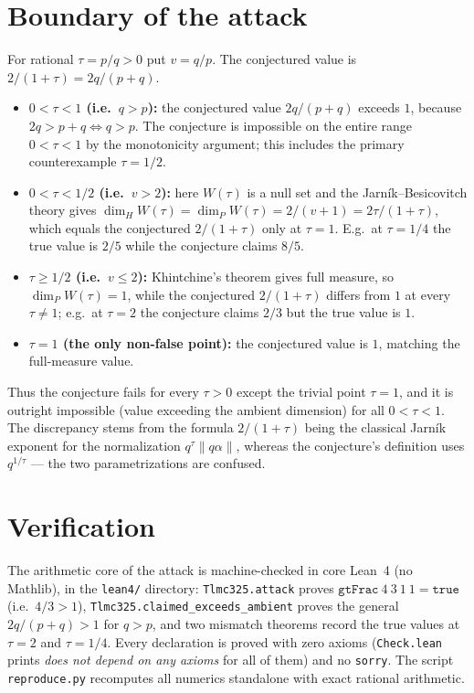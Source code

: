 \documentclass[11pt]{article}
\theoremstyle{definition}
\begin{document}
\section{Boundary of the attack}

For rational $\tau = p/q > 0$ put $v = q/p$. The conjectured value is
$2/(1+\tau) = 2q/(p+q)$.

\begin{itemize}
\item \textbf{$0 < \tau < 1$ (i.e.\ $q > p$):} the conjectured value
$2q/(p+q)$ exceeds $1$, because $2q > p+q \iff q > p$. The conjecture is
impossible on the entire range $0 < \tau < 1$ by the monotonicity argument;
this includes the primary counterexample $\tau = 1/2$.
\item \textbf{$0 < \tau < 1/2$ (i.e.\ $v > 2$):} here $W(\tau)$ is a null
set and the Jarn\'ik--Besicovitch theory gives
$\dim_H W(\tau) = \dim_P W(\tau) = 2/(v+1) = 2\tau/(1+\tau)$,
which equals the conjectured $2/(1+\tau)$ only at $\tau = 1$. E.g.\ at
$\tau = 1/4$ the true value is $2/5$ while the conjecture claims $8/5$.
\item \textbf{$\tau \ge 1/2$ (i.e.\ $v \le 2$):} Khintchine's theorem gives
full measure, so $\dim_P W(\tau) = 1$, while the conjectured $2/(1+\tau)$
differs from $1$ at every $\tau \neq 1$; e.g.\ at $\tau = 2$ the conjecture
claims $2/3$ but the true value is $1$.
\item \textbf{$\tau = 1$ (the only non-false point):} the conjectured value
is $1$, matching the full-measure value.
\end{itemize}

Thus the conjecture fails for every $\tau > 0$ except the trivial point
$\tau = 1$, and it is outright impossible (value exceeding the ambient
dimension) for all $0 < \tau < 1$. The discrepancy stems from the formula
$2/(1+\tau)$ being the classical Jarn\'ik exponent for the
normalization $q^{\tau}\|q\alpha\|$, whereas the conjecture's
definition uses $q^{1/\tau}$ — the two parametrizations are confused.

\section{Verification}

The arithmetic core of the attack is machine-checked in core Lean~4
(no Mathlib), in the \texttt{lean4/} directory:
\texttt{Tlmc325.attack} proves $\texttt{gtFrac}\ 4\ 3\ 1\ 1 = \texttt{true}$
(i.e.\ $4/3 > 1$), \texttt{Tlmc325.claimed\_exceeds\_ambient} proves the
general $2q/(p+q) > 1$ for $q > p$, and two mismatch theorems record the
true values at $\tau = 2$ and $\tau = 1/4$. Every declaration is proved
with zero axioms (\texttt{Check.lean} prints \emph{does not depend on any
axioms} for all of them) and no \texttt{sorry}. The script
\texttt{reproduce.py} recomputes all numerics standalone with exact
rational arithmetic.
\end{document}
